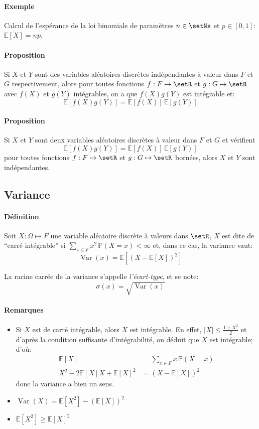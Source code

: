 \documentclass[a4paper,10pt,french,openany]{memoir}
\newcommand{\Proba}{\mathbb{P}}
\newcommand{\Esper}{\mathbb{E}}
\newcommand{\abs}[1]{\lvert #1 \rvert}
\DeclareMathOperator{\Var}{Var}
\begin{document}
\paragraph{Exemple}
Calcul de l'espérance de la loi binomiale de paramètres $n\in\setNs$ et $p\in[0,1]$: $\Esper[X]=n p$.

\paragraph{Proposition}
Si $X$ et $Y$ sont des variables aléatoires discrètes indépendantes à valeur dans $F$ et $G$ respectivement, alors pour toutes fonctions $f: F\mapsto \setR$ et $g: G\mapsto \setR$ avec $f(X)$ et $g(Y)$ intégrables, on a que $f(X) g(Y)$ est intégrable et:\[\Esper[f(X) g(Y)]=\Esper[f(X)] \,\Esper[g(Y)]\]

\paragraph{Proposition}
Si $X$ et $Y$ sont deux variables aléatoires discrètes à valeur dans $F$ et $G$ et vérifient \[\Esper[f(X) g(Y)] = \Esper[f(X)]\,\Esper[g(Y)]\] pour toutes fonctions $f:F\mapsto \setR$ et $g: G\mapsto \setR$ bornées, alors $X$ et $Y$ sont indépendantes.

\subsection{Variance}

\paragraph{Définition}
Soit $X:\Omega \mapsto F$ une variable aléatoire discrète à valeurs dans $\setR$, $X$ est dite de ``carré intégrable'' si $\sum_{x\in F}x^2\, \Proba(X=x) < \infty$ et, dans ce cas, la variance vaut: \[\Var(x)=\Esper[(X-\Esper[X])^2]\]

La racine carrée de la variance s'appelle \emph{l'écart-type}, et se note: \[\sigma(x)=\sqrt{\Var(x)}\]

\paragraph{Remarques}
\begin{itemize}
 \item Si $X$ est de carré intégrable, alors $X$ est intégrable. En effet, $\abs{X}\leq\frac{1+X^2}2$ et d'après la condition suffisante d'intégrabilité, on déduit que $X$ est intégrable; d'où:
 \begin{align*}
 \Esper[X] &= \sum_{x\in F} x\,\Proba(X=x) \\
 X^2-2 \Esper[X] X+\Esper[X]^2 &= (X-\Esper[X])^2
 \end{align*}
 donc la variance a bien un sens.
 \item $\Var(X)=\Esper[X^2]-(\Esper[X])^2$
 \item $\Esper[X^2]\geq\Esper[X]^2$
\end{itemize}
\end{document}
